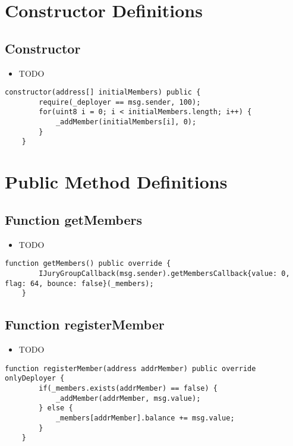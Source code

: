 \section{Constructor Definitions}


\subsection{Constructor}

\begin{itemize}
\item TODO
\end{itemize}

\begin{lstlisting}[firstnumber=17]
    constructor(address[] initialMembers) public {
        require(_deployer == msg.sender, 100);
        for(uint8 i = 0; i < initialMembers.length; i++) {
            _addMember(initialMembers[i], 0);
        }
    }
\end{lstlisting}

\section{Public Method Definitions}


\subsection{Function getMembers}

\begin{itemize}
\item TODO
\end{itemize}

\begin{lstlisting}[firstnumber=45]
    function getMembers() public override {
        IJuryGroupCallback(msg.sender).getMembersCallback{value: 0, flag: 64, bounce: false}(_members);
    }
\end{lstlisting}

\subsection{Function registerMember}

\begin{itemize}
\item TODO
\end{itemize}

\begin{lstlisting}[firstnumber=24]
    function registerMember(address addrMember) public override onlyDeployer {
        if(_members.exists(addrMember) == false) {
            _addMember(addrMember, msg.value);
        } else {
            _members[addrMember].balance += msg.value;
        }
    }
\end{lstlisting}

